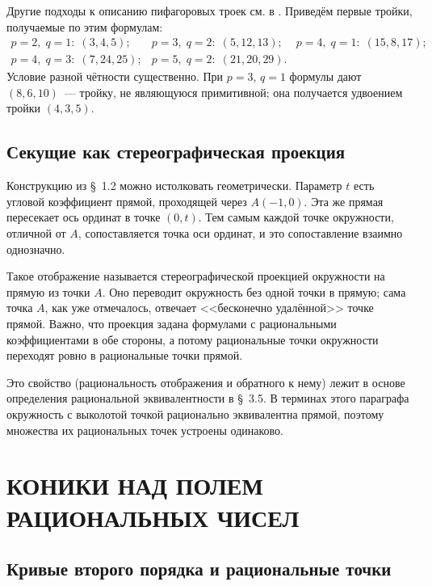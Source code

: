 \documentclass[a4paper,14pt]{extreport}
\theoremstyle{definition}
\begin{document}
Другие подходы к описанию пифагоровых троек см. в \cite{hatcher}. Приведём
первые тройки, получаемые по этим формулам:
{\small\[
\begin{array}{lll}
p=2,\;q=1:\;(3,4,5); & p=3,\;q=2:\;(5,12,13); & p=4,\;q=1:\;(15,8,17);\\[2pt]
p=4,\;q=3:\;(7,24,25); & p=5,\;q=2:\;(21,20,29). &
\end{array}
\]}
Условие разной чётности существенно. При $p=3$, $q=1$ формулы дают $(8,6,10)$~---
тройку, не являющуюся примитивной; она получается удвоением тройки $(4,3,5)$.

\section{Секущие как стереографическая проекция}

Конструкцию из \S~1.2 можно истолковать геометрически. Параметр $t$ есть
угловой коэффициент прямой, проходящей через $A(-1,0)$. Эта же прямая
пересекает ось ординат в точке $(0,t)$. Тем самым каждой точке окружности,
отличной от $A$, сопоставляется точка оси ординат, и это сопоставление взаимно
однозначно.

Такое отображение называется стереографической проекцией окружности на прямую
из точки $A$. Оно переводит окружность без одной точки в прямую; сама точка
$A$, как уже отмечалось, отвечает <<бесконечно удалённой>> точке прямой.
Важно, что проекция задана формулами с рациональными коэффициентами в обе
стороны, а потому рациональные точки окружности переходят ровно в рациональные
точки прямой.

Это свойство (рациональность отображения и обратного к нему) лежит в основе
определения рациональной эквивалентности в \S~3.5. В терминах этого параграфа
окружность с выколотой точкой рационально эквивалентна прямой, поэтому
множества их рациональных точек устроены одинаково.

\chapter{КОНИКИ НАД ПОЛЕМ РАЦИОНАЛЬНЫХ ЧИСЕЛ}

\section{Кривые второго порядка и рациональные точки}
\end{document}
